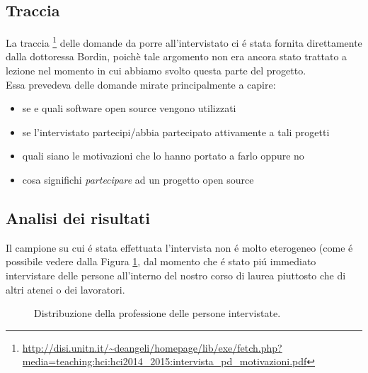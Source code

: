 \documentclass[12pt]{article} %
\begin{document}
\subsection{Traccia}
La traccia \footnote{\url{http://disi.unitn.it/~deangeli/homepage/lib/exe/fetch.php?media=teaching:hci:hci2014_2015:intervista_pd_motivazioni.pdf}} delle domande da porre all'intervistato ci \'e stata fornita direttamente dalla dottoressa Bordin, poich\`e tale argomento non era ancora stato trattato a lezione nel momento in cui abbiamo svolto questa parte del progetto.\\
Essa prevedeva delle domande mirate principalmente a capire:
\begin{itemize}
\item se e quali software open source vengono utilizzati
\item se l'intervistato partecipi/abbia partecipato attivamente a tali progetti
\item quali siano le motivazioni che lo hanno portato a farlo oppure no
\item cosa significhi \emph{partecipare} ad un progetto open source
\end{itemize}
\subsection{Analisi dei risultati}

Il campione su cui \'e stata effettuata l'intervista non \'e molto eterogeneo (come \'e possibile vedere dalla Figura \ref{fig:distribuzione}, dal momento che \'e stato pi\'u immediato intervistare delle persone all'interno del nostro corso di laurea piuttosto che di altri atenei o dei lavoratori.

\begin{figure}[H] 
\caption{Distribuzione della professione delle persone intervistate.}
\label{fig:distribuzione}
\end{figure}
\end{document}
